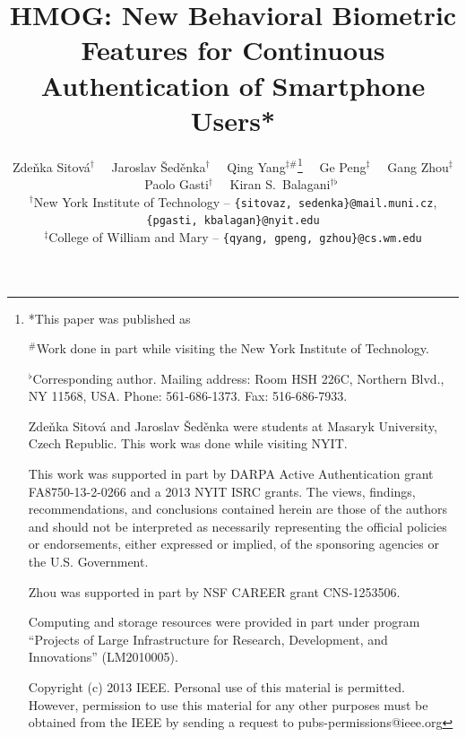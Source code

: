 \documentclass[journal]{IEEEtran}
\begin{document}
%
%


\title{HMOG: New Behavioral Biometric Features for Continuous Authentication of Smartphone Users*}

\author{Zde\v nka Sitov\'a$^\dag$~~
        Jaroslav \v Sed\v enka$^\dag$~~
        Qing Yang$^{\ddag\#}$\thanks{*This paper was published as~\cite{7349202}
        
\smallskip
$^\#$Work done in part while visiting the New York Institute of Technology.
        
\smallskip
$^\flat$Corresponding author. Mailing address: Room HSH 226C, Northern Blvd., NY 11568, USA. Phone: 561-686-1373. Fax: 516-686-7933.

\smallskip
Zde\v nka Sitov\'a and Jaroslav \v Sed\v enka were students at Masaryk University, Czech Republic. This work was done while visiting NYIT.

\smallskip
This work was supported in part by DARPA Active Authentication grant FA8750-13-2-0266 and a 2013 NYIT ISRC grants. The views, findings, recommendations, and conclusions contained herein are those of the authors and should not be interpreted as necessarily representing the official policies or endorsements, either expressed or implied, of the sponsoring agencies or the U.S. Government.

\smallskip
Zhou was supported in part by NSF CAREER grant CNS-1253506.

\smallskip
Computing and storage resources were provided in part under program ``Projects of Large Infrastructure for Research, Development, and Innovations'' (LM2010005).


\smallskip
Copyright (c) 2013 IEEE. Personal use of this material is permitted. However, permission to use this material for any other purposes must be obtained from the IEEE by sending a request to pubs-permissions@ieee.org
}~~
        Ge Peng$^\ddag$~~
        Gang Zhou$^\ddag$~~
        Paolo Gasti$^\dag$~~
        Kiran S.~Balagani$^{\dag \flat}$ \\
        \medskip $^\dag$New York Institute of Technology  --  {\tt \small \{sitovaz, sedenka\}@mail.muni.cz}, {\tt \small \{pgasti, kbalagan\}@nyit.edu}  \\
        $^\ddag$College of William and Mary -- {\tt \small \{qyang, gpeng, gzhou\}@cs.wm.edu}
}
%
%
%
%
%
%
%
%
%
%
%
%
%



%
%
%

\maketitle
\end{document}
